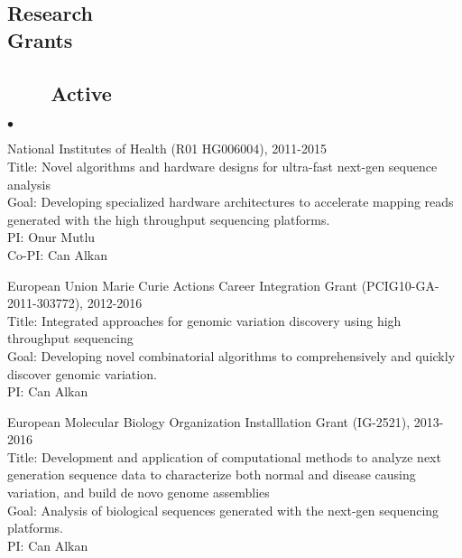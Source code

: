 \documentclass[margin,line]{res}
\newenvironment{list2}{
  \begin{list}{$\bullet$}{%
      \setlength{\itemsep}{0in}
      \setlength{\parsep}{0in} \setlength{\parskip}{0in}
      \setlength{\topsep}{0in} \setlength{\partopsep}{0in} 
      \setlength{\leftmargin}{0.2in}}}{\end{list}}
\begin{document}
\begin{resume}
\clearpage
          \section{\sc Research \\ Grants}
                                       \vspace{-0.4cm}
                                       \subsection{\small \sc ~~~~Active}

                                       \begin{list2}
                                       \item
                                         National Institutes of Health (R01 HG006004), 2011-2015\\
                                         Title: Novel algorithms and hardware designs for ultra-fast next-gen sequence analysis\\
                                         Goal: Developing specialized hardware architectures to accelerate mapping reads generated with the high throughput sequencing platforms.\\
                                         PI: Onur Mutlu\\
                                         Co-PI: Can Alkan
                                       \item
                                         European Union Marie Curie Actions Career Integration Grant (PCIG10-GA-2011-303772),  2012-2016\\
                                         Title: Integrated approaches for genomic variation discovery using high throughput sequencing\\
                                         Goal: Developing novel combinatorial algorithms to comprehensively and quickly discover genomic variation.\\
                                         PI: Can Alkan
                                       \item
                                         European Molecular Biology Organization Installlation Grant (IG-2521), 2013-2016 \\
                                         Title: Development and application of computational methods to analyze next generation sequence data to characterize both normal and disease causing variation, and build de novo genome assemblies\\
                                         Goal: Analysis of biological sequences generated with the next-gen sequencing platforms.\\
                                         PI: Can Alkan
                                       \end{list2}
                                       

\end{resume}
\end{document}
